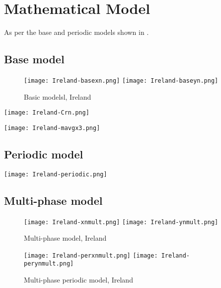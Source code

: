 \section{Mathematical Model}
\label{ch:mathmodel}

As per the base and periodic models shown in \cite{grigor20}.

\subsection{Base model}

\begin{figure}[!htb]
  \texttt{[image: Ireland-basexn.png]} \label{fig:ireland-basexn}
\endminipage\hfill
{}
  \texttt{[image: Ireland-baseyn.png]} \label{fig:ireland-baseyn}
\endminipage
\caption{Basic modelsl, Ireland}
\end{figure}

\texttt{[image: Ireland-Crn.png]}

\texttt{[image: Ireland-mavgx3.png]}


\subsection{Periodic model}

\texttt{[image: Ireland-periodic.png]}


\subsection{Multi-phase model}

\begin{figure}[!htb]
  \texttt{[image: Ireland-xnmult.png]} \label{fig:ireland-xnmult}
\endminipage\hfill
{}
  \texttt{[image: Ireland-ynmult.png]} \label{fig:ireland-ynmult}
\endminipage
\caption{Multi-phase model, Ireland}
\end{figure}

\begin{figure}[!htb]
  \texttt{[image: Ireland-perxnmult.png]} \label{fig:ireland-perxnmult}
\endminipage\hfill
{}
  \texttt{[image: Ireland-perynmult.png]} \label{fig:ireland-perynmult}
\endminipage
\caption{Multi-phase periodic model, Ireland}
\end{figure}

